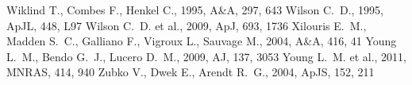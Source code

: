 \documentclass[useAMS,usenatbib,usegraphicx]{mn2e}
\newcommand{\aj}{AJ}                   %
\newcommand{\apj}{ApJ}                 %
\newcommand{\apjl}{ApJL}               %
\newcommand{\apjs}{ApJS}               %
\newcommand{\aap}{A\&A}                %
\newcommand{\mnras}{MNRAS}             %
\begin{document}
\begin{thebibliography}{}
 Wiklind T., Combes F., Henkel C., 1995, \aap, 297, 643
 Wilson C.~D., 1995, \apjl, 448, L97
 Wilson C.~D. et al., 2009, \apj, 693, 1736
 Xilouris E.~M., Madden S.~C., Galliano F., Vigroux L., Sauvage M., 2004, \aap, 416, 41
 Young L.~M., Bendo G.~J., Lucero D.~M., 2009, \aj, 137, 3053
 Young L.~M. et al., 2011, \mnras, 414, 940
 Zubko V., Dwek E., Arendt R.~G., 2004, \apjs, 152, 211
\end{thebibliography}



\label{lastpage}
\end{document}
